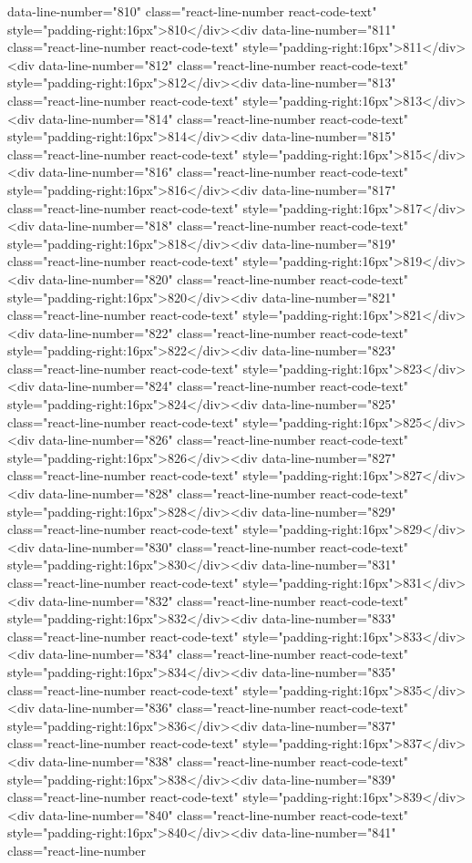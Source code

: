 data-line-number="810" class="react-line-number react-code-text" style="padding-right:16px">810</div><div data-line-number="811" class="react-line-number react-code-text" style="padding-right:16px">811</div><div data-line-number="812" class="react-line-number react-code-text" style="padding-right:16px">812</div><div data-line-number="813" class="react-line-number react-code-text" style="padding-right:16px">813</div><div data-line-number="814" class="react-line-number react-code-text" style="padding-right:16px">814</div><div data-line-number="815" class="react-line-number react-code-text" style="padding-right:16px">815</div><div data-line-number="816" class="react-line-number react-code-text" style="padding-right:16px">816</div><div data-line-number="817" class="react-line-number react-code-text" style="padding-right:16px">817</div><div data-line-number="818" class="react-line-number react-code-text" style="padding-right:16px">818</div><div data-line-number="819" class="react-line-number react-code-text" style="padding-right:16px">819</div><div data-line-number="820" class="react-line-number react-code-text" style="padding-right:16px">820</div><div data-line-number="821" class="react-line-number react-code-text" style="padding-right:16px">821</div><div data-line-number="822" class="react-line-number react-code-text" style="padding-right:16px">822</div><div data-line-number="823" class="react-line-number react-code-text" style="padding-right:16px">823</div><div data-line-number="824" class="react-line-number react-code-text" style="padding-right:16px">824</div><div data-line-number="825" class="react-line-number react-code-text" style="padding-right:16px">825</div><div data-line-number="826" class="react-line-number react-code-text" style="padding-right:16px">826</div><div data-line-number="827" class="react-line-number react-code-text" style="padding-right:16px">827</div><div data-line-number="828" class="react-line-number react-code-text" style="padding-right:16px">828</div><div data-line-number="829" class="react-line-number react-code-text" style="padding-right:16px">829</div><div data-line-number="830" class="react-line-number react-code-text" style="padding-right:16px">830</div><div data-line-number="831" class="react-line-number react-code-text" style="padding-right:16px">831</div><div data-line-number="832" class="react-line-number react-code-text" style="padding-right:16px">832</div><div data-line-number="833" class="react-line-number react-code-text" style="padding-right:16px">833</div><div data-line-number="834" class="react-line-number react-code-text" style="padding-right:16px">834</div><div data-line-number="835" class="react-line-number react-code-text" style="padding-right:16px">835</div><div data-line-number="836" class="react-line-number react-code-text" style="padding-right:16px">836</div><div data-line-number="837" class="react-line-number react-code-text" style="padding-right:16px">837</div><div data-line-number="838" class="react-line-number react-code-text" style="padding-right:16px">838</div><div data-line-number="839" class="react-line-number react-code-text" style="padding-right:16px">839</div><div data-line-number="840" class="react-line-number react-code-text" style="padding-right:16px">840</div><div data-line-number="841" class="react-line-number 